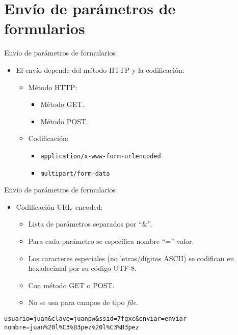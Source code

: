 
\part{Envío de parámetros de formularios}


\begin{slide}{Envío de parámetros de formularios}
  \begin{itemize}
  \item El envío depende del método HTTP y la
    codificación:
    \begin{itemize}
    \item Método HTTP:
      \begin{itemize}
      \item Método GET.
      \item Método POST.
      \end{itemize}
    \item Codificación:
      \begin{itemize}
      \item \verb+application/x-www-form-urlencoded+
      \item \verb+multipart/form-data+
      \end{itemize}
    \end{itemize}
  \end{itemize}
\end{slide}

\begin{slide}{Envío de parámetros de formularios}
  \begin{itemize}
  \item Codificación URL--encoded:
    \begin{itemize}
    \item Lista de parámetros separados por ``\&''.
    \item Para cada parámetro se especifica nombre ``='' valor.
    \item Los caracteres especiales (no letras/dígitos ASCII) 
      se codifican en hexadecimal por su código UTF-8.
    \item Con método GET o POST.
    \item No se usa para campos de tipo \emph{file}.
    \end{itemize}
  \end{itemize}

\begin{Verbatim}[fontfamily=tt,fontsize=\fontsize{8}{8}]
usuario=juan&clave=juanpw&ssid=7fgxc&enviar=enviar
nombre=juan%20l%C3%B3pez%20l%C3%B3pez
\end{Verbatim}


\end{slide}

